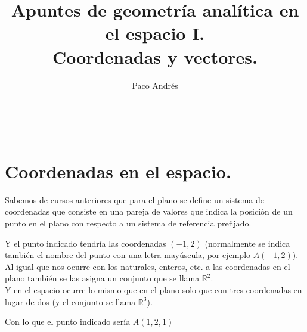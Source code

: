 \documentclass[a4paper,11pt,answers]{exam}
\def \autor{Paco Andrés}
\def \titulo{Apuntes de geometría analítica en el espacio I.\\Coordenadas y vectores.}
\begin{document}
\title{\titulo}
\date{}
\author{\autor}
\maketitle

\begin{center}
\doclicenseLongText\\
\vspace{.25cm}
\doclicenseImage
\end{center}
\tableofcontents
\newpage

\section{Coordenadas en el espacio.}
Sabemos de cursos anteriores que para el plano se define un sistema de coordenadas que consiste en una pareja de valores que indica la posición de un punto en el plano con respecto a un sistema de referencia prefijado.
\begin{center}
\end{center}
Y el punto indicado tendría las coordenadas $(-1, 2)$ (normalmente se indica también el nombre del punto con una letra mayúscula, por ejemplo $A(-1, 2)$).\\

Al igual que nos ocurre con los naturales, enteros, etc. a las coordenadas en el plano también se las asigna un conjunto que se llama $\mathbb{R}^2$.\\

Y en el espacio ocurre lo mismo que en el plano solo que con tres coordenadas en lugar de dos (y el conjunto se llama $\mathbb{R}^3$).
\begin{center}
\end{center}
Con lo que el punto indicado sería $A(1,2,1)$
\end{document}
